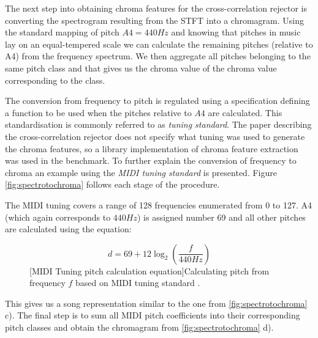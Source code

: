 The next step into obtaining chroma features for the cross-correlation rejector
is converting the spectrogram resulting from the STFT into a chromagram. Using
the standard mapping of pitch $A4 = 440 Hz$ and knowing that pitches in music
lay on an equal-tempered scale we can calculate the remaining pitches (relative
to A4) from the frequency spectrum.  We then aggregate all pitches belonging to
the same pitch class and that gives us the chroma value of the chroma value
corresponding to the class.

The conversion from frequency to pitch is regulated using a specification
defining a function to be used when the pitches relative to $A4$ are calculated.
This standardisation is commonly referred to as \textit{tuning standard}. The
paper describing the cross-correlation rejector does not specify what tuning was
used to generate the chroma features, so a library implementation of chroma
feature extraction was used in the benchmark. To further explain the conversion
of frequency to chroma an example using the \textit{MIDI tuning standard} is
presented. Figure \ref{fig:spectrotochroma} follows each stage of the procedure.

The MIDI tuning covers a range of 128 frequencies enumerated from 0 to 127. A4
(which again corresponds to $440 Hz$) is assigned number 69 and all other
pitches are calculated using the equation:

\begin{figure}[H]
    \label{fig:midiequation}
    \begin{equation}
       d = 69 + 12 \log_{2}(\frac{f}{440 Hz})
    \end{equation} 
    [MIDI Tuning pitch calculation equation]{Calculating pitch from frequency $f$ based on MIDI tuning standard \cite{mts}.}
\end{figure} 

This gives us a song representation similar to the one from
\ref{fig:spectrotochroma} c). The final step is to sum all MIDI pitch
coefficients into their corresponding pitch classes and obtain the chromagram
from \ref{fig:spectrotochroma} d).

